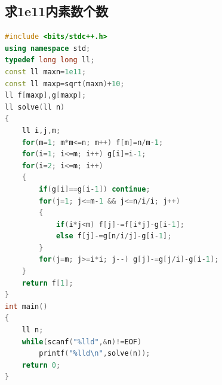 \documentclass[UTF8,a4paper,titlepage]{ctexart}
\begin{document}
\subsection{求1e11内素数个数}
        \begin{lstlisting}[language=C++]
#include <bits/stdc++.h>
using namespace std;
typedef long long ll;
const ll maxn=1e11;
const ll maxp=sqrt(maxn)+10;
ll f[maxp],g[maxp];
ll solve(ll n)
{
    ll i,j,m;
    for(m=1; m*m<=n; m++) f[m]=n/m-1;
    for(i=1; i<=m; i++) g[i]=i-1;
    for(i=2; i<=m; i++)
    {
        if(g[i]==g[i-1]) continue;
        for(j=1; j<=m-1 && j<=n/i/i; j++)
        {
            if(i*j<m) f[j]-=f[i*j]-g[i-1];
            else f[j]-=g[n/i/j]-g[i-1];
        }
        for(j=m; j>=i*i; j--) g[j]-=g[j/i]-g[i-1];
    }
    return f[1];
}
int main()
{
    ll n;
    while(scanf("%lld",&n)!=EOF)
        printf("%lld\n",solve(n));
    return 0;
}       
        \end{lstlisting}
\end{document}
